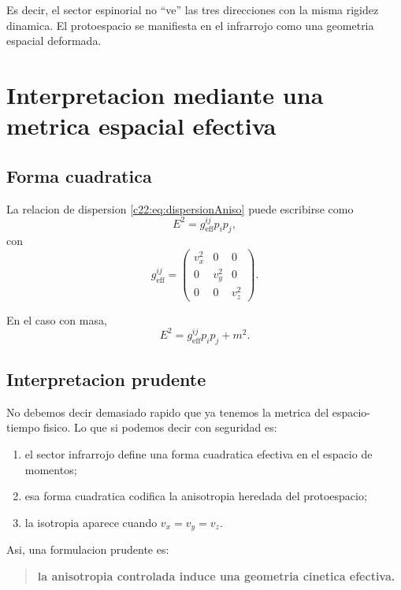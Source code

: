 Es decir, el sector espinorial no \enquote{ve} las tres direcciones con la misma rigidez dinamica. El protoespacio se manifiesta en el infrarrojo como una geometria espacial deformada.

\section{Interpretacion mediante una metrica espacial efectiva}
\subsection{Forma cuadratica}
La relacion de dispersion \eqref{c22:eq:dispersionAniso} puede escribirse como
\begin{equation}
E^2 = g_{\mathrm{eff}}^{ij} p_i p_j,
\end{equation}
con
\begin{equation}
g_{\mathrm{eff}}^{ij}
=
\begin{pmatrix}
v_x^2 & 0 & 0\\
0 & v_y^2 & 0\\
0 & 0 & v_z^2
\end{pmatrix}.
\label{c22:eq:geffcontr}
\end{equation}

En el caso con masa,
\begin{equation}
E^2 = g_{\mathrm{eff}}^{ij} p_i p_j + m^2.
\end{equation}

\subsection{Interpretacion prudente}
No debemos decir demasiado rapido que ya tenemos la metrica del espacio-tiempo fisico. Lo que si podemos decir con seguridad es:
\begin{enumerate}[label=\arabic*.]
    \item el sector infrarrojo define una forma cuadratica efectiva en el espacio de momentos;
    \item esa forma cuadratica codifica la anisotropia heredada del protoespacio;
    \item la isotropia aparece cuando \(v_x=v_y=v_z\).
\end{enumerate}

Asi, una formulacion prudente es:
\begin{quote}
\textbf{la anisotropia controlada induce una geometria cinetica efectiva.}
\end{quote}


